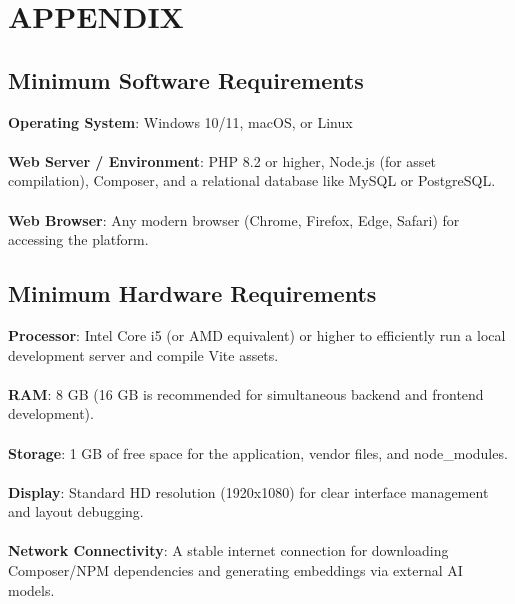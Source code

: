 \chapter{APPENDIX}

\section{Minimum Software Requirements}
\medskip
\textbf{Operating System}: Windows 10/11, macOS, or Linux
\\\\
\textbf{Web Server / Environment}: PHP 8.2 or higher, Node.js (for asset compilation), Composer, and a relational database like MySQL or PostgreSQL.
\\\\
\textbf{Web Browser}: Any modern browser (Chrome, Firefox, Edge, Safari) for accessing the platform.

\section{Minimum Hardware Requirements}
\textbf{Processor}: Intel Core i5 (or AMD equivalent) or higher to efficiently run a local development server and compile Vite assets.
\\\\
\textbf{RAM}: 8 GB (16 GB is recommended for simultaneous backend and frontend development).
\\\\
\textbf{Storage}: 1 GB of free space for the application, vendor files, and node\_modules.
\\\\
\textbf{Display}: Standard HD resolution (1920x1080) for clear interface management and layout debugging.
\\\\
\textbf{Network Connectivity}: A stable internet connection for downloading Composer/NPM dependencies and generating embeddings via external AI models.
